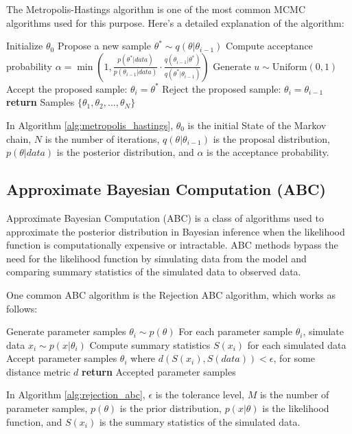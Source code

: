 \documentclass[12pt]{book} %
\begin{document}
The Metropolis-Hastings algorithm is one of the most common MCMC algorithms used for this purpose. Here's a detailed explanation of the algorithm:
\FloatBarrier
\begin{algorithm}[H]
\caption{Metropolis-Hastings Algorithm}\label{alg:metropolis_hastings}
\begin{algorithmic}[1]
\State Initialize $\theta_0$
    \State Propose a new sample $\theta^* \sim q(\theta|\theta_{i-1})$
    \State Compute acceptance probability $\alpha = \min\left(1, \frac{p(\theta^*|data)}{p(\theta_{i-1}|data)} \cdot \frac{q(\theta_{i-1}|\theta^*)}{q(\theta^*|\theta_{i-1})}\right)$
    \State Generate $u \sim \text{Uniform}(0,1)$
        \State Accept the proposed sample: $\theta_i = \theta^*$
    \Else
        \State Reject the proposed sample: $\theta_i = \theta_{i-1}$
    \EndIf
\EndFor
\State \textbf{return} Samples $\{\theta_1, \theta_2, ..., \theta_N\}$
\EndProcedure
\end{algorithmic}
\end{algorithm}
\FloatBarrier
In Algorithm \ref{alg:metropolis_hastings}, $\theta_0$ is the initial State of the Markov chain, $N$ is the number of iterations, $q(\theta|\theta_{i-1})$ is the proposal distribution, $p(\theta|data)$ is the posterior distribution, and $\alpha$ is the acceptance probability.

\subsection{Approximate Bayesian Computation (ABC)}
Approximate Bayesian Computation (ABC) is a class of algorithms used to approximate the posterior distribution in Bayesian inference when the likelihood function is computationally expensive or intractable. ABC methods bypass the need for the likelihood function by simulating data from the model and comparing summary statistics of the simulated data to observed data.

One common ABC algorithm is the Rejection ABC algorithm, which works as follows:
\FloatBarrier
\begin{algorithm}[H]
\caption{Rejection ABC Algorithm}\label{alg:rejection_abc}
\begin{algorithmic}[1]
\State Generate parameter samples $\theta_i \sim p(\theta)$
\State For each parameter sample $\theta_i$, simulate data $x_i \sim p(x|\theta_i)$
\State Compute summary statistics $S(x_i)$ for each simulated data
\State Accept parameter samples $\theta_i$ where $d(S(x_i), S(data)) < \epsilon$, for some distance metric $d$
\State \textbf{return} Accepted parameter samples
\EndProcedure
\end{algorithmic}
\end{algorithm}
\FloatBarrier
In Algorithm \ref{alg:rejection_abc}, $\epsilon$ is the tolerance level, $M$ is the number of parameter samples, $p(\theta)$ is the prior distribution, $p(x|\theta)$ is the likelihood function, and $S(x_i)$ is the summary statistics of the simulated data.
\end{document}
